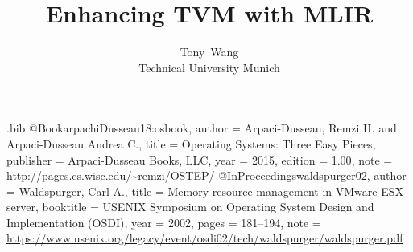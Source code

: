 \usepackage{filecontents}

\begin{filecontents}{\jobname.bib}
@Book{arpachiDusseau18:osbook,
  author =       {Arpaci-Dusseau, Remzi H. and Arpaci-Dusseau Andrea C.},
  title =        {Operating Systems: Three Easy Pieces},
  publisher =    {Arpaci-Dusseau Books, LLC},
  year =         2015,
  edition =      {1.00},
  note =         {\url{http://pages.cs.wisc.edu/~remzi/OSTEP/}}
}
@InProceedings{waldspurger02,
  author =       {Waldspurger, Carl A.},
  title =        {Memory resource management in {VMware ESX} server},
  booktitle =    {USENIX Symposium on Operating System Design and
                  Implementation (OSDI)},
  year =         2002,
  pages =        {181--194},
  note =         {\url{https://www.usenix.org/legacy/event/osdi02/tech/waldspurger/waldspurger.pdf}}}
\end{filecontents}



\date{}

\title{\Large \bf Enhancing TVM with MLIR}

\author{
{\rm Tony\ Wang}\\
Technical University Munich
} %

\maketitle



